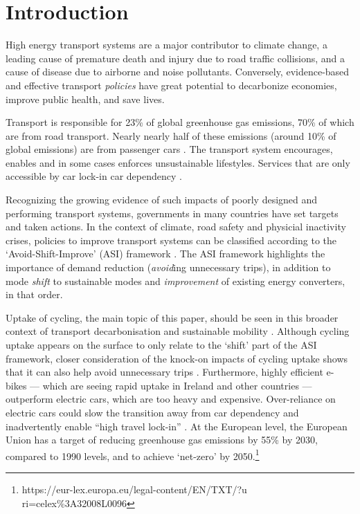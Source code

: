 \documentclass[
  super,
  preprint,
  3p]{elsarticle}
\begin{document}
\newpage{}

\hypertarget{introduction}{%
\section{Introduction}\label{introduction}}

High energy transport systems are a major contributor to climate change,
a leading cause of premature death and injury due to road traffic
collisions, and a cause of disease due to airborne and noise pollutants.
Conversely, evidence-based and effective transport \emph{policies} have
great potential to decarbonize economies, improve public health, and
save lives.

Transport is responsible for 23\% of global greenhouse gas emissions,
70\% of which are from road transport. Nearly nearly half of these
emissions (around 10\% of global emissions) are from passenger cars
\citep{jaramillo2022}. The transport system encourages, enables and in
some cases enforces unsustainable lifestyles. Services that are only
accessible by car lock-in car dependency
\citep{gray2001, shergold2012, motte-baumvol2010}.

Recognizing the growing evidence of such impacts of poorly designed and
performing transport systems, governments in many countries have set
targets and taken actions. In the context of climate, road safety and
physicial inactivity crises, policies to improve transport systems can
be classified according to the `Avoid-Shift-Improve' (ASI) framework
\citep{jaramillo2022}. The ASI framework highlights the importance of
demand reduction (\emph{avoid}ing unnecessary trips), in addition to
mode \emph{shift} to sustainable modes and \emph{improvement} of
existing energy converters, in that order.

Uptake of cycling, the main topic of this paper, should be seen in this
broader context of transport decarbonisation \citep{brand2020} and
sustainable mobility \citep{burns2013}. Although cycling uptake appears
on the surface to only relate to the `shift' part of the ASI framework,
closer consideration of the knock-on impacts of cycling uptake shows
that it can also help avoid unnecessary trips \citep{nello-deakin2020}.
Furthermore, highly efficient e-bikes --- which are seeing rapid uptake
in Ireland and other countries --- outperform electric cars, which are
too heavy and expensive. Over-reliance on electric cars could slow the
transition away from car dependency and inadvertently enable ``high
travel lock-in'' \citep{anable2019}. At the European level, the European
Union has a target of reducing greenhouse gas emissions by 55\% by 2030,
compared to 1990 levels, and to achieve `net-zero' by 2050.\footnote{https://eur-lex.europa.eu/legal-content/EN/TXT/?u
  ri=celex\%3A32008L0096}
\end{document}
